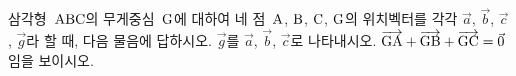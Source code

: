 삼각형~$\mathrm{ABC}$의 무게중심~$\mathrm{G}$에 대하여 네 점~$\mathrm{A}$, $\mathrm{B}$, $\mathrm{C}$, $\mathrm{G}$의 위치벡터를 각각 $\vec{a}$, $\vec{b}$, $\vec{c}$, $\vec{g}$라 할 때, 다음 물음에 답하시오.
 $\vec{g}$를 $\vec{a}$, $\vec{b}$, $\vec{c}$로 나타내시오.
 $\overrightarrow{\mathrm{GA}}+\overrightarrow{\mathrm{GB}}+\overrightarrow{\mathrm{GC}}=\vec{0}$임을 보이시오.
